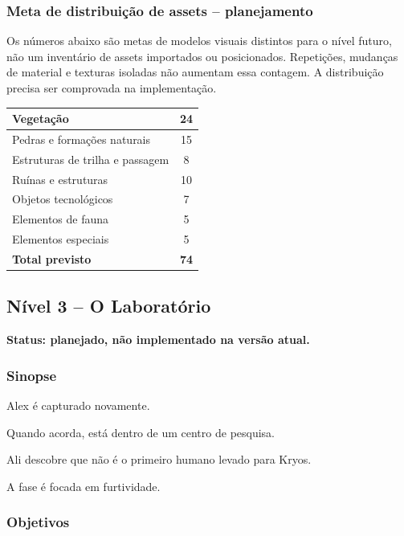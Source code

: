 \documentclass[12pt,a4paper]{article}
\begin{document}
\subsubsection*{Meta de distribuição de assets -- planejamento}

Os números abaixo são metas de modelos visuais distintos para o
nível futuro, não um inventário de assets importados ou posicionados.
Repetições, mudanças de material e texturas isoladas não aumentam
essa contagem. A distribuição precisa ser comprovada na implementação.


\begin{center}
\begin{tabularx}{\textwidth}{|X|c|}
\hline
Vegetação & 24\\
\hline
Pedras e formações naturais & 15\\
\hline
Estruturas de trilha e passagem & 8\\
\hline
Ruínas e estruturas & 10\\
\hline
Objetos tecnológicos & 7\\
\hline
Elementos de fauna & 5\\
\hline
Elementos especiais & 5\\
\hline
\textbf{Total previsto} & \textbf{74}\\
\hline
\end{tabularx}
\end{center}


\subsection{Nível 3 -- O Laboratório}

\textbf{Status: planejado, não implementado na versão atual.}


\subsubsection*{Sinopse}

Alex é capturado novamente.

Quando acorda, está dentro de um centro de pesquisa.

Ali descobre que não é o primeiro humano levado para Kryos.

A fase é focada em furtividade.

\subsubsection*{Objetivos}
\end{document}
